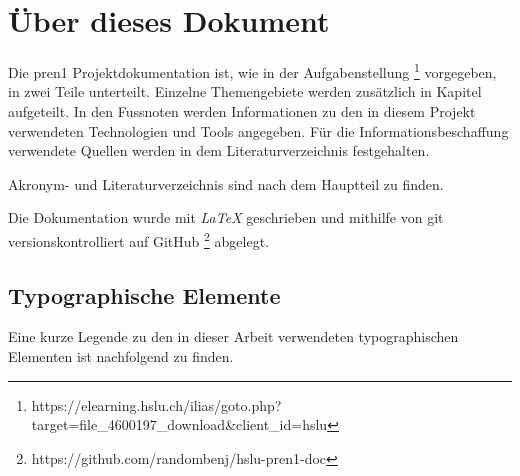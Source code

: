   \section*{Über dieses Dokument}

  Die \acrshort{pren1} Projektdokumentation ist, wie in der Aufgabenstellung \footnote{
    https://elearning.hslu.ch/ilias/goto.php?target=file\_4600197\_download\&client\_id=hslu
  } vorgegeben, in zwei Teile unterteilt.
  Einzelne Themengebiete werden zusätzlich in Kapitel aufgeteilt.
  In den Fussnoten werden Informationen zu den in diesem Projekt verwendeten
  Technologien und Tools angegeben.
  Für die Informationsbeschaffung verwendete Quellen werden in dem Literaturverzeichnis festgehalten.

  Akronym- und Literaturverzeichnis sind nach dem Hauptteil zu finden.

  Die Dokumentation wurde mit {\it LaTeX} geschrieben und mithilfe von git
  versionskontrolliert auf GitHub \footnote{https://github.com/randombenj/hslu-pren1-doc}
  abgelegt.
  
  \subsection*{Typographische Elemente}

  Eine kurze Legende zu den in dieser Arbeit verwendeten typographischen Elementen
  ist nachfolgend zu finden.



  
  \newpage 
